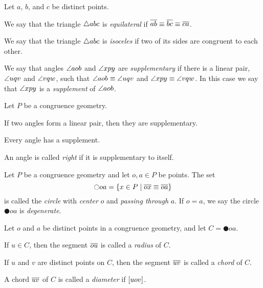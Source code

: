 \begin{dfn}
Let \(a\), \(b\), and \(c\) be distinct points.
\begin{proplist}
\item We say that the triangle \(\bigtriangleup{abc}\) is \emph{equilateral} if \(\overline{ab} \equiv \overline{bc} \equiv \overline{ca}\).
\item We say that the triangle \(\bigtriangleup{abc}\) is \emph{isoceles} if two of its sides are congruent to each other.
\end{proplist}
\end{dfn}


\begin{dfn}
We say that angles \(\angle{aob}\) and \(\angle{xpy}\) are \emph{supplementary} if there is a linear pair, \(\angle{uqv}\) and \(\angle{vqw}\), such that \(\angle{aob} \equiv \angle{uqv}\) and \(\angle{xpy} \equiv \angle{vqw}\).
In this case we say that \(\angle{xpy}\) is a \emph{supplement} of \(\angle{aob}\).
\end{dfn}

\begin{prop}
Let \(P\) be a congruence geometry.
\begin{proplist}
\item If two angles form a linear pair, then they are supplementary.
\item Every angle has a supplement.
\end{proplist}
\end{prop}

\begin{dfn}
An angle is called \emph{right} if it is supplementary to itself.
\end{dfn}


\begin{dfn}[Circle]
Let \(P\) be a congruence geometry and let \(o,a \in P\) be points.
The set \[ \ocircle{oa} = \{ x \in P \mid \overline{ox} \equiv \overline{oa} \} \] is called the \emph{circle} with \emph{center} \(o\) and \emph{passing through} \(a\).
If \(o = a\), we say the circle \(\CIRCLE{o}{a}\) is \emph{degenerate}.
\end{dfn}


\begin{dfn}
Let \(o\) and \(a\) be distinct points in a congruence geometry, and let \(C = \CIRCLE{o}{a}\).
\begin{proplist}
\item If \(u \in C\), then the segment \(\overline{ou}\) is called a \emph{radius} of \(C\).
\item If \(u\) and \(v\) are distinct points on \(C\), then the segment \(\overline{uv}\) is called a \emph{chord} of \(C\).
\item A chord \(\overline{uv}\) of \(C\) is called a \emph{diameter} if \([ u o v ]\).
\end{proplist}
\end{dfn}



